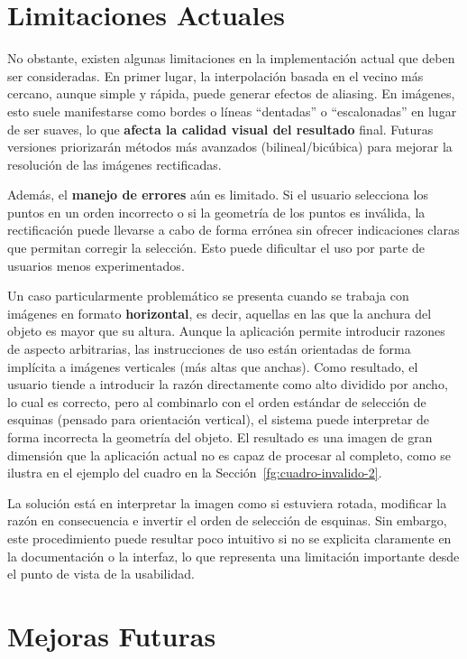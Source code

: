 \section{Limitaciones Actuales}
\label{sec:limitaciones}
No obstante, existen algunas limitaciones en la implementación actual que deben ser consideradas. En primer lugar, la interpolación basada en el vecino más cercano, aunque simple y rápida, puede generar efectos de aliasing. En imágenes, esto suele manifestarse como bordes o líneas “dentadas” o “escalonadas” en lugar de ser suaves, lo que \textbf{afecta la calidad visual del resultado} final. Futuras versiones priorizarán métodos más avanzados (bilineal/bicúbica) para mejorar la resolución de las imágenes rectificadas.

Además, el \textbf{manejo de errores} aún es limitado. Si el usuario selecciona los puntos en un orden incorrecto o si la geometría de los puntos es inválida, la rectificación puede llevarse a cabo de forma errónea sin ofrecer indicaciones claras que permitan corregir la selección. Esto puede dificultar el uso por parte de usuarios menos experimentados.

Un caso particularmente problemático se presenta cuando se trabaja con imágenes en formato \textbf{horizontal}, es decir, aquellas en las que la anchura del objeto es mayor que su altura. Aunque la aplicación permite introducir razones de aspecto arbitrarias, las instrucciones de uso están orientadas de forma implícita a imágenes verticales (más altas que anchas). Como resultado, el usuario tiende a introducir la razón directamente como alto dividido por ancho, lo cual es correcto, pero al combinarlo con el orden estándar de selección de esquinas (pensado para orientación vertical), el sistema puede interpretar de forma incorrecta la geometría del objeto. El resultado es una imagen de gran dimensión que la aplicación actual no es capaz de procesar al completo, como se ilustra en el ejemplo del cuadro en la Sección~\ref{fg:cuadro-invalido-2}.

La solución está en interpretar la imagen como si estuviera rotada, modificar la razón en consecuencia e invertir el orden de selección de esquinas. Sin embargo, este procedimiento puede resultar poco intuitivo si no se explicita claramente en la documentación o la interfaz, lo que representa una limitación importante desde el punto de vista de la usabilidad.


\section{Mejoras Futuras}

